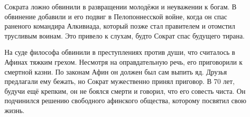 Сократа ложно обвинили в развращении молодёжи и неуважении к богам. В обвинение добавили и его подвиг в Пелопоннесской войне, когда он спас раненого командира Алкивиада, который позже стал правителем и отомстил трусливым воинам. Это привело к слухам, будто Сократ спас будущего тирана.

На суде философа обвинили в преступлениях против души, что считалось в Афинах тяжким грехом. Несмотря на оправдательную речь, его приговорили к смертной казни. По законам Афин он должен был сам выпить яд. Друзья предлагали ему бежать, но Сократ мужественно принял приговор. В 70 лет, будучи ещё крепким, он не боялся смерти и говорил, что его совесть чиста. Он подчинился решению свободного афинского общества, которому посвятил свою жизнь.

